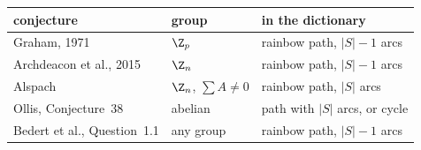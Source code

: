 \begin{center}
\renewcommand{\arraystretch}{1.2}
\small
\begin{tabular}{p{}p{}p{}}
\textbf{conjecture} & \textbf{group} & \textbf{in the dictionary}\\\hline
Graham, 1971 & $\Z_p$ & rainbow path, $|S|-1$ arcs\\
Archdeacon et al., 2015 & $\Z_n$ & rainbow path, $|S|-1$ arcs\\
Alspach & $\Z_n$, $\sum A\neq0$ & rainbow path, $|S|$ arcs\\
Ollis, Conjecture~38 & abelian & path with $|S|$ arcs, or cycle\\
Bedert et al., Question~1.1 & any group & rainbow path, $|S|-1$ arcs
\end{tabular}
\end{center}

